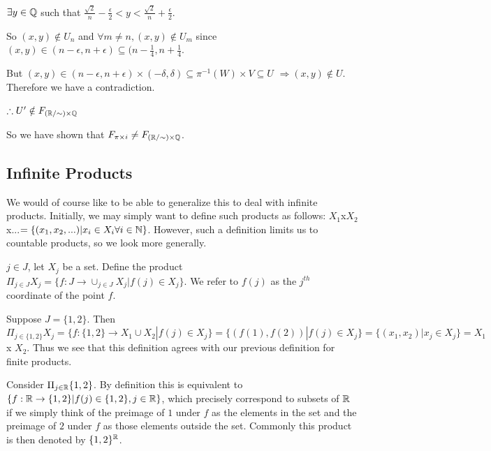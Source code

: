 $\exists y \in \mathbb Q$ such that $\frac{\sqrt{2}}{n} - \frac{\epsilon}{2} < y < \frac{\sqrt{2}}{n} + \frac{\epsilon}{2}$.

So $(x,y) \notin U_n$ and $\forall m\neq n, (x,y)\notin U_m$ since $(x,y) \in (n-\epsilon, n+\epsilon)\subseteq (n-\frac{1}{4}, n+\frac{1}{4}$.

But $(x,y) \in (n-\epsilon, n+\epsilon) \times (-\delta, \delta) \subseteq \pi^{-1}(W) \times V \subseteq U$ $\Rightarrow (x,y) \notin U$. Therefore we have a contradiction.

$\therefore U' \notin F_{(\mathbb R/\sim)\times \mathbb Q}$

So we have shown that $F_{\pi\times i} \neq F_{(\mathbb R/\sim) \times \mathbb Q}$.

\subsection{Infinite Products} We would of course like to be able to generalize this to deal with infinite products. Initially, we may simply want to define such products as follows: $X_1$x$X_2$x...$=\{(x_1,x_2,...)|x_i \in X_i \forall i \in \mathbb N \}$. However, such a definition limits us to countable products, so we look more generally.
\begin{definition}
	$j \in J$, let $X_j$ be a set. Define the product $\Pi_{j \in J} X_j = \{f:J \rightarrow \cup_{j \in J}X_j|f(j) \in X_j\}.$ We refer to $f(j)$ as the $j^{th}$ coordinate of the point $f$. 
\end{definition}
\begin{example}
	Suppose $J = \{1,2\}$. Then $\Pi_{j\in \{1,2\}}X_j = \{f: \{1,2\} \rightarrow X_1\cup X_2|f(j) \in X_j\} = \{(f(1),f(2))|f(j) \in X_j\}=\{(x_1,x_2)|x_j \in X_j\} = X_1$ x $X_2.$ Thus we see that this definition agrees with our previous definition for finite products. 
\end{example}
\begin{example}
	Consider $\Pi_{j \in \mathbb R}\{1,2\}$. By definition this is equivalent to $\{f: \mathbb R \rightarrow \{1,2\}| f(j) \in \{1,2\}, j \in \mathbb R\}$, which precisely correspond to subsets of $\mathbb R$ if we simply think of the preimage of $1$ under $f$ as the elements in the set and the preimage of $2$ under $f$ as those elements outside the set. Commonly this product is then denoted by $\{1,2\}^{\mathbb R}$. 
\end{example}

